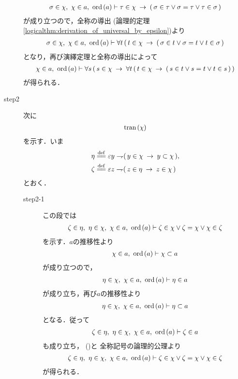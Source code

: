 \begin{sketch}
\begin{description}
				\begin{align}
					\sigma \in \chi,\ \chi \in a,\ \operatorname*{ord}\hspace{0.15em}(a) \vdash 
					\tau \in \chi \hspace{0.25em}\rightarrow\hspace{0.25em} (\, \sigma \in \tau \vee \sigma = \tau \vee \tau \in \sigma\, )
				\end{align}
				が成り立つので，全称の導出
				(論理的定理\ref{logicalthm:derivation_of_universal_by_epsilon})より
				\begin{align}
					\sigma \in \chi,\ \chi \in a,\ \operatorname*{ord}\hspace{0.15em}(a) \vdash 
					\forall t\, (\, t \in \chi \hspace{0.25em}\rightarrow\hspace{0.25em} (\, \sigma \in t \vee \sigma = t \vee t \in \sigma\, )
				\end{align}
				となり，再び演繹定理と全称の導出によって
				\begin{align}
					\chi \in a,\ \operatorname*{ord}\hspace{0.15em}(a) \vdash 
					\forall s\, (\, s \in \chi \hspace{0.25em}\rightarrow\hspace{0.25em} \forall t\, (\, t \in \chi \hspace{0.25em}\rightarrow\hspace{0.25em} (\, s \in t \vee s = t \vee t \in s\, )\, )
				\end{align}
				が得られる．
				
			\item[step2] 次に
				\begin{align}
					\operatorname*{tran}\hspace{0.15em}(\chi)
				\end{align}
				を示す．いま
				\begin{align}
					\eta &\defeq \varepsilon y \negation (\, y \in \chi \rarrow y \subset \chi\, ), \\
					\zeta &\defeq \varepsilon z \negation (\, z \in \eta \rarrow z \in \chi\, )
				\end{align}
				とおく．
				\begin{description}
					\item[step2-1]
						この段では
						\begin{align}
							\zeta \in \eta,\ \eta \in \chi,\ \chi \in a,\ \operatorname*{ord}\hspace{0.15em}(a) 
							\vdash 
							\zeta \in \chi \vee \zeta = \chi \vee \chi \in \zeta
						\end{align}
						を示す．$a$の推移性より
						\begin{align}
							\chi \in a,\ \operatorname*{ord}\hspace{0.15em}(a) \vdash \chi \subset a
						\end{align}
						が成り立つので，
						\begin{align}
							\eta \in \chi,\ \chi \in a,\ \operatorname*{ord}\hspace{0.15em}(a) \vdash \eta \in a
						\end{align}
						が成り立ち，再び$a$の推移性より
						\begin{align}
							\eta \in \chi,\ \chi \in a,\ \operatorname*{ord}\hspace{0.15em}(a) \vdash 
							\eta \subset a
						\end{align}
						となる．従って
						\begin{align}
							\zeta \in \eta,\ \eta \in \chi,\ \chi \in a,\ \operatorname*{ord}\hspace{0.15em}(a) 
							\vdash \zeta \in a
						\end{align}
						も成り立ち，
						()と
						全称記号の論理的公理より
						\begin{align}
							\zeta \in \eta,\ \eta \in \chi,\ \chi \in a,\ \operatorname*{ord}\hspace{0.15em}(a) 
							\vdash 
							\zeta \in \chi \vee \zeta = \chi \vee \chi \in \zeta
							\label{fom:thm_transitive_totally_ordered_class_5}
						\end{align}
						が得られる．
						

\end{description}
\end{description}
\end{sketch}
